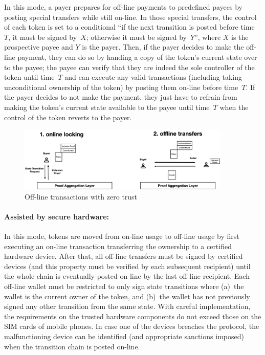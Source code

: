 \documentclass{article}
\begin{document}
In this mode, a payer prepares for off-line payments to predefined payees by posting special transfers while still on-line. In those special transfers, the control of each token is set to a conditional ``if the next transition is posted before time~$T$, it must be signed by~$X$; otherwise it must be signed by~$Y$'', where $X$ is the prospective payee and $Y$ is the payer. Then, if the payer decides to make the off-line payment, they can do so by handing a copy of the token's current state over to the payee; the payee can verify that they are indeed the sole controller of the token until time~$T$ and can execute any valid transactions (including taking unconditional ownership of the token) by posting them on-line before time~$T$. If the payer decides to not make the payment, they just have to refrain from making the token's current state available to the payee until time~$T$ when the control of the token reverts to the payer.

\begin{figure}[ht]
    \centering
    \includegraphics[width=0.9\textwidth]{offline_lock.png}
    \caption{Off-line transactions with zero trust}
    \label{fig:Offline}
\end{figure}

\paragraph{Assisted by secure hardware:}

In this mode, tokens are moved from on-line usage to off-line usage by first executing an on-line transaction transferring the ownership to a certified hardware device. After that, all off-line transfers must be signed by certified devices (and this property must be verified by each subsequent recipient) until the whole chain is eventually posted on-line by the last off-line recipient. Each off-line wallet must be restricted to only sign state transitions where (a)~the wallet is the current owner of the token, and (b)~the wallet has not previously signed any other transition from the same state. With careful implementation, the requirements on the trusted hardware components do not exceed those on the SIM cards of mobile phones. In case one of the devices breaches the protocol, the malfunctioning device can be identified (and appropriate sanctions imposed) when the transition chain is posted on-line.
\end{document}
